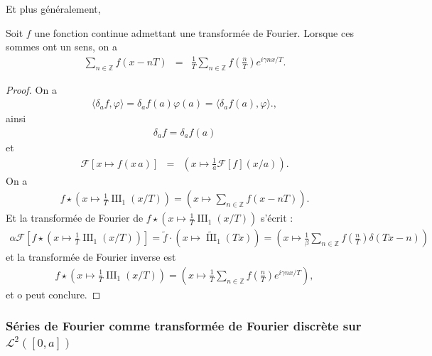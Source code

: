 Et plus généralement,
\begin{Theo}
    Soit $f$ une fonction continue admettant une transformée de Fourier. Lorsque ces sommes ont un sens, on a 
    \begin{eqnarray}
        \sum_{n\in\mathbb Z} f(x-nT) & =&  \frac{1}{T} \sum_{n \in \mathbb Z } f \left ( \frac{n}{T} \right )  e^{i \gamma nx/T }.
    \end{eqnarray}
\end{Theo}
\begin{proof}
    On a 
    \begin{eqnarray}
        \langle \delta_a f , \varphi \rangle = \delta_a f(a) \varphi(a) = \langle \delta_a f(a) , \varphi \rangle. ,
    \end{eqnarray}
    ainsi 
    \begin{eqnarray}
        \delta_a f = \delta_a f(a)
    \end{eqnarray}
    et 
    \begin{eqnarray}
        \mathcal F [ x \mapsto f(x\, a)]  & = &   \left ( x \mapsto  \frac{1}{a}  \mathcal F [ f ](x/a) \right ).
    \end{eqnarray}
    On a 
    \begin{eqnarray}
         f \star \left ( x \mapsto \frac{1}T \operatorname{III}_{1}(x/T) \right )  =  \left ( x \mapsto  \sum_{n \in \mathbb Z } f ( x - nT ) \right ).
    \end{eqnarray}
    Et la transformée de Fourier de  $f \star\left ( x \mapsto \frac{1}T \operatorname{III}_{1}(x/T) \right ) $ s'écrit :
    \begin{eqnarray}
        \alpha \mathcal F \left [ f \star \left ( x \mapsto \frac{1}T \operatorname{III}_{1}(x/T)  \right ) \right ]  = \tilde f \cdot  \left ( x \mapsto \widetilde{\operatorname{III}}_{1} ( T x ) \right )  =  \left (  x \mapsto \frac{1} \beta \sum_{n \in \mathbb Z } f \left ( \frac{n}{T} \right )  \delta ( T x - n ) \right )     
    \end{eqnarray}
    et  la transformée de Fourier inverse est 
    \begin{eqnarray}
        f \star \left ( x \mapsto \frac{1}T \operatorname{III}_{1}(x/T) \right ) = \left (  x \mapsto \frac{1}T \sum_{n \in \mathbb Z } f \left ( \frac{n}{T} \right )  e^{i \gamma nx/T }  \right ),
    \end{eqnarray}
    et o peut conclure.
\end{proof}

\subsubsection{Séries de Fourier comme transformée de Fourier discrète sur $\mathcal L^2([0,a])$}

